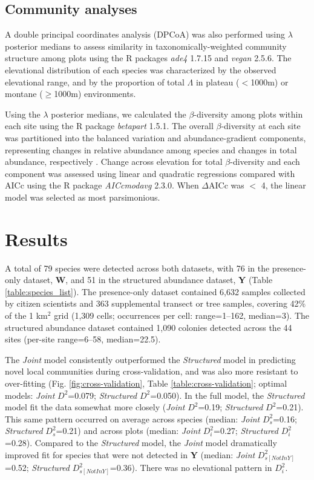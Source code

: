 \documentclass[preprint,final,times,12pt,3p]{elsarticle}
\begin{document}
\subsection{Community analyses}
A double principal coordinates analysis (DPCoA) was also performed using $\lambda$ posterior medians to assess similarity in taxonomically-weighted community structure among plots \citep{Dray2015,Pavoine2019} using the R packages \emph{ade4} 1.7.15 and \emph{vegan} 2.5.6. The elevational distribution of each species was characterized by the observed elevational range, and by the proportion of total $\Lambda$ in plateau ($<$1000m) or montane ($\geq$1000m) environments.

Using the $\lambda$ posterior medians, we calculated the $\beta$-diversity among plots within each site using the R package \emph{betapart} 1.5.1. The overall $\beta$-diversity at each site was partitioned into the balanced variation and abundance-gradient components, representing changes in relative abundance among species and changes in total abundance, respectively \citep{Baselga2017}. Change across elevation for total $\beta$-diversity and each component was assessed using linear and quadratic regressions compared with AICc using the R package \emph{AICcmodavg} 2.3.0. When $\Delta$AICc was $<$ 4, the linear model was selected as most parsimonious. 




\section{Results}
\label{S:3}
A total of 79 species were detected across both datasets, with 76 in the presence-only dataset, \textbf{W}, and 51 in the structured abundance dataset, \textbf{Y} (Table \ref{table:species_list}). The presence-only dataset contained 6,632 samples collected by citizen scientists and 363 supplemental transect or tree samples, covering 42\% of the 1 km$^2$ grid (1,309 cells; occurrences per cell: range=1–162, median=3). The structured abundance dataset contained 1,090 colonies detected across the 44 sites (per-site range=6–58, median=22.5). 

The \emph{Joint} model consistently outperformed the \emph{Structured} model in predicting novel local communities during cross-validation, and was also more resistant to over-fitting (Fig. \ref{fig:cross-validation}, Table \ref{table:cross-validation}; optimal models: \emph{Joint} $D^2$=0.079; \emph{Structured} $D^2$=0.050). In the full model, the \emph{Structured} model fit the data somewhat more closely (\emph{Joint} $D^2$=0.19; \emph{Structured} $D^2$=0.21). This same pattern occurred on average across species (median: \emph{Joint} $D^2_s$=0.16; \emph{Structured} $D^2_s$=0.21) and across plots (median: \emph{Joint} $D^2_i$=0.27; \emph{Structured} $D^2_i$=0.28). Compared to the \emph{Structured} model, the \emph{Joint} model dramatically improved fit for species that were not detected in \textbf{Y} (median: \emph{Joint} $D^2_{s[Not In Y]}$=0.52; \emph{Structured} $D^2_{s[Not In Y]}$=0.36). There was no elevational pattern in $D^2_i$.
\end{document}

